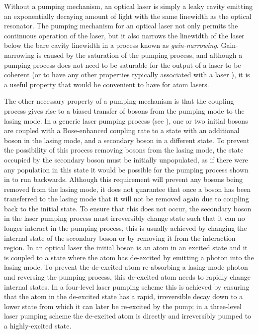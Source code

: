 Without a pumping mechanism, an optical laser is simply a leaky cavity emitting an exponentially decaying amount of light with the same linewidth as the optical resonator.  The pumping mechanism for an optical laser not only permits the continuous operation of the laser, but it also narrows the linewidth of the laser below the bare cavity linewidth in a process known as \emph{gain-narrowing}. Gain-narrowing is caused by the saturation of the pumping process, and although a pumping process does not need to be saturable for the output of a laser to be coherent (or to have any other properties typically associated with a laser \cite{Wiseman:1997ba}), it is a useful property that would be convenient to have for atom lasers.


The other necessary property of a pumping mechanism is that the coupling process gives rise to a biased transfer of bosons from the pumping mode to the lasing mode.  In a generic laser pumping process (see ), one or two initial bosons are coupled with a Bose-enhanced coupling rate to a state with an additional boson in the lasing mode, and a secondary boson in a different state.  To prevent the possibility of this process removing bosons from the lasing mode, the state occupied by the secondary boson must be initially unpopulated, as if there were any population in this state it would be possible for the pumping process shown in  to run backwards.  Although this requirement will prevent any bosons being removed from the lasing mode, it does not guarantee that once a boson has been transferred to the lasing mode that it will not be removed again due to coupling back to the initial state.  To ensure that this does not occur, the secondary boson in the laser pumping process must irreversibly change state such that it can no longer interact in the pumping process, this is usually achieved by changing the internal state of the secondary boson or by removing it from the interaction region.  In an optical laser the initial boson is an atom in an excited state and it is coupled to a state where the atom has de-excited by emitting a photon into the lasing mode. To prevent the de-excited atom re-absorbing a lasing-mode photon and reversing the pumping process, this de-excited atom needs to rapidly change internal states. In a four-level laser pumping scheme this is achieved by ensuring that the atom in the de-excited state has a rapid, irreversible decay down to a lower state from which it can later be re-excited by the pump; in a three-level laser pumping scheme the de-excited atom is directly and irreversibly pumped to a highly-excited state.

